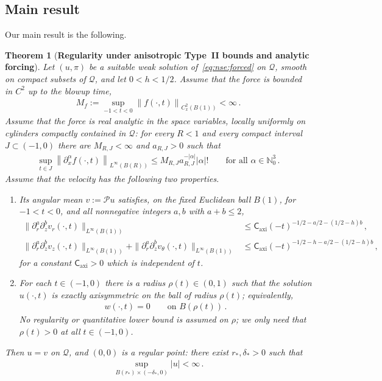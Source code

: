 \documentclass[11pt,reqno]{amsproc}
\numberwithin{equation}{section}
\newtheorem{theorem}{Theorem}[section]
\theoremstyle{remark}
\newcommand{\p}{\partial}
\newcommand{\norm}[1]{\left\|#1\right\|}
\newcommand{\Caxi}{\mathsf{C}_{\mathrm{axi}}}
\begin{document}
\subsection{Main result}
\label{sec:aniso:main}
Our main result is the following.
\begin{theorem}[{\bf Regularity under anisotropic Type~II bounds and analytic forcing}]
\label{thm:main}
Let $(u,\pi)$ be a suitable weak solution of~\eqref{eq:nse:forced} on $\mathcal Q$, smooth on compact subsets of $\mathcal Q$, and let $0<h<1/2$. Assume that the force is bounded in $C^2$ up to the blowup time,
\begin{align}
M_f:=\sup_{-1<t<0}\norm{f(\cdot,t)}_{C_x^2(B(1))}<\infty
\,.
\label{eq:interior:force:c-two}
\end{align}
Assume that the force is real analytic in the space variables, locally uniformly on cylinders compactly contained in $\mathcal Q$: for every $R<1$ and every compact interval $J\subset(-1,0)$ there are $M_{R,J}<\infty$ and $a_{R,J}>0$ such that
\begin{align}
\sup_{t\in J}\norm{\p_x^\alpha f(\cdot,t)}_{L^\infty(B(R))}
\le M_{R,J}a_{R,J}^{-|\alpha|}|\alpha|!
\qquad\mbox{for all }\alpha\in\mathbb N_0^3
\,.
\label{eq:interior:force:analytic}
\end{align}
Assume that the velocity has the following two properties.
\begin{enumerate}[label=(\roman*),leftmargin=2em]
\item Its angular mean $v:=\mathcal Pu$ satisfies, on the fixed Euclidean ball $B(1)$, for $-1<t<0$, and all nonnegative integers $a,b$ with $a+b\le2$,
\begin{subequations}
\label{eq:interior:mean:bounds}
\begin{align}
\|\p_r^a\p_z^b v_r(\cdot,t)\|_{L^\infty(B(1))}
&\le \Caxi(-t)^{-1/2-a/2-(1/2-h)b}\,,
\\
\| \p_r^a\p_z^b v_z(\cdot,t)\|_{L^\infty(B(1))}
+\|\p_r^a\p_z^b v_\theta(\cdot,t)\|_{L^\infty(B(1))}
&\le \Caxi(-t)^{-1/2-h-a/2-(1/2-h)b}
\,,
\end{align}
\end{subequations}
for a constant $\Caxi>0$ which is independent of $t$.
\item For each $t\in(-1,0)$ there is a radius $\rho(t)\in(0,1)$ such that the solution $u(\cdot,t)$ is exactly axisymmetric on the ball of radius $\rho(t)$; equivalently,
\begin{align}
w(\cdot,t)=0
\qquad\mbox{on }B(\rho(t))
\,.
\label{eq:interior:core}
\end{align}
No regularity or quantitative lower bound is assumed on $\rho$; we only need that $\rho(t)>0$ at all $t\in(-1,0)$.
\end{enumerate}
Then $u=v$ on $\mathcal Q$, and $(0,0)$ is a regular point: there exist $r_*,\delta_*>0$ such that
\begin{align}
\sup_{B(r_*)\times(-\delta_*,0)}|u|<\infty
\,.
\label{eq:interior:regular}
\end{align}
\end{theorem}
\end{document}
